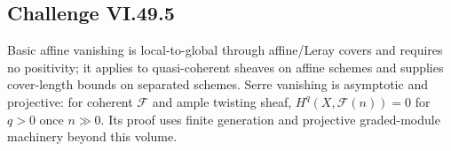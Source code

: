 \subsection*{Challenge VI.49.5}
\begin{solution}
Basic affine vanishing is local-to-global through affine/Leray covers and requires no positivity; it applies to quasi-coherent sheaves on affine schemes and supplies cover-length bounds on separated schemes.  Serre vanishing is asymptotic and projective: for coherent \(\mathcal F\) and ample twisting sheaf, \(H^q(X,\mathcal F(n))=0\) for \(q>0\) once \(n\gg0\).  Its proof uses finite generation and projective graded-module machinery beyond this volume.
\end{solution}


